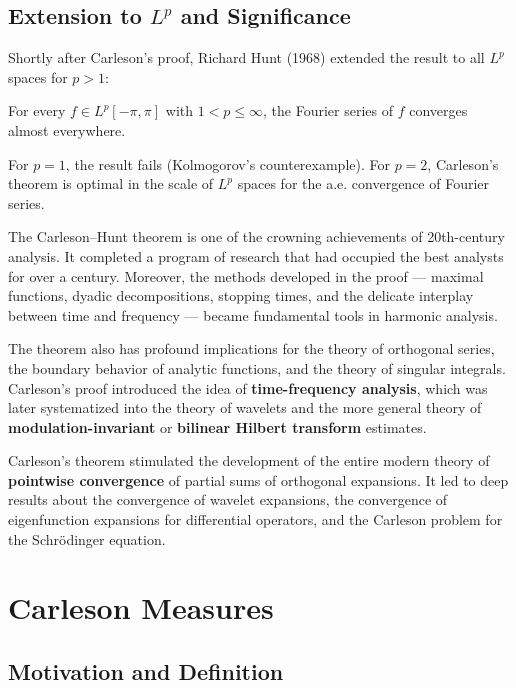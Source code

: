 \subsection{Extension to \texorpdfstring{\(L^p\)}{Lp Spaces} and Significance}

Shortly after Carleson's proof, Richard Hunt (1968) extended the result to all \(L^p\) spaces for \(p > 1\):

\begin{theorem}
For every \(f \in L^p[-\pi,\pi]\) with \(1 < p \leq \infty\), the Fourier series of \(f\) converges almost everywhere.
\end{theorem}

For \(p = 1\), the result fails (Kolmogorov's counterexample). For \(p = 2\), Carleson's theorem is optimal in the scale of \(L^p\) spaces for the a.e. convergence of Fourier series.

The Carleson--Hunt theorem is one of the crowning achievements of 20th-century analysis. It completed a program of research that had occupied the best analysts for over a century. Moreover, the methods developed in the proof --- maximal functions, dyadic decompositions, stopping times, and the delicate interplay between time and frequency --- became fundamental tools in harmonic analysis.

The theorem also has profound implications for the theory of orthogonal series, the boundary behavior of analytic functions, and the theory of singular integrals. Carleson's proof introduced the idea of \textbf{time-frequency analysis}, which was later systematized into the theory of wavelets and the more general theory of \textbf{modulation-invariant} or \textbf{bilinear Hilbert transform} estimates.

\begin{remark}
Carleson's theorem stimulated the development of the entire modern theory of \textbf{pointwise convergence} of partial sums of orthogonal expansions. It led to deep results about the convergence of wavelet expansions, the convergence of eigenfunction expansions for differential operators, and the Carleson problem for the Schr\"odinger equation.
\end{remark}

\section{Carleson Measures}

\subsection{Motivation and Definition}

